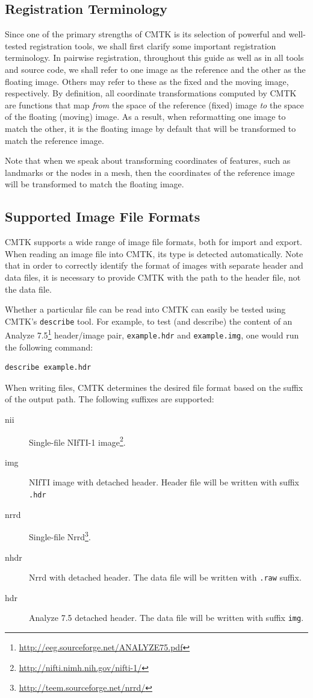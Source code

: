 \documentclass{InsightArticle}
\begin{document}
\subsection{Registration Terminology}

Since one of the primary strengths of CMTK is its selection of powerful and
well-tested registration tools, we shall first clarify some important
registration terminology. In pairwise registration, throughout this guide as
well as in all tools and source code, we shall refer to one image as the
reference and the other as the floating image. Others may refer to these as
the fixed and the moving image, respectively. By definition, all coordinate
transformations computed by CMTK are functions that map {\em from\/} the space
of the reference (fixed) image {\em to\/} the space of the floating (moving)
image. As a result, when reformatting one image to match the other, it is the
floating image by default that will be transformed to match the reference
image.

Note that when we speak about transforming coordinates of features, such as
landmarks or the nodes in a mesh, then the coordinates of the reference image
will be transformed to match the floating image.

\subsection{Supported Image File Formats}

CMTK supports a wide range of image file formats, both for import and
export. When reading an image file into CMTK, its type is detected
automatically. Note that in order to correctly identify the format of images
with separate header and data files, it is necessary to provide CMTK with the
path to the header file, not the data file.

Whether a particular file can be read into CMTK can easily be tested using
CMTK's \verb|describe| tool. For example, to test (and describe) the content
of an Analyze 7.5\footnote{\url{http://eeg.sourceforge.net/ANALYZE75.pdf}}
header/image pair, \verb|example.hdr| and \verb|example.img|, one would run
the following command:
\begin{verbatim}
describe example.hdr
\end{verbatim}

When writing files, CMTK determines the desired file format based on the
suffix of the output path. The following suffixes are supported:
\begin{description}
\item [nii] Single-file NIfTI-1 image\footnote{\url{http://nifti.nimh.nih.gov/nifti-1/}}.
\item [img] NIfTI image with detached header. Header file will be written with
  suffix \verb|.hdr|
\item [nrrd] Single-file Nrrd\footnote{\url{http://teem.sourceforge.net/nrrd/}}.
\item [nhdr] Nrrd with detached header. The data file will be written with
  \verb|.raw| suffix.
\item [hdr] Analyze 7.5 detached header. The data file will be written with
  suffix \verb|img|.
\end{description}
\end{document}
